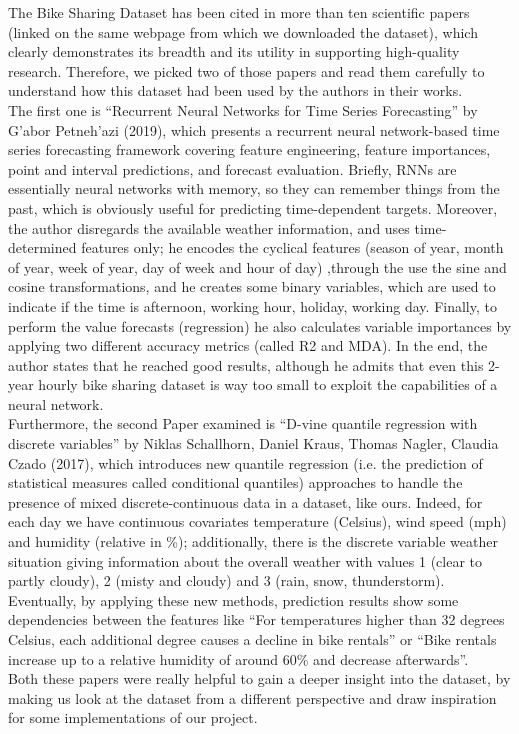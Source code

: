 \documentclass[11pt,a4paper]{article}
\begin{document}
The Bike Sharing Dataset has been cited in more than ten scientific papers (linked on the same webpage from which we downloaded the dataset), which clearly demonstrates its breadth and its utility in supporting high-quality research. Therefore, we picked two of those papers and read them carefully to understand how this dataset had been used by the authors in their works. \\
The first one is “Recurrent Neural Networks for Time Series Forecasting” by G'abor Petneh'azi (2019), which presents a recurrent neural network-based time series forecasting framework covering feature engineering, feature importances, point and interval predictions, and forecast evaluation. Briefly, RNNs are essentially neural networks with memory, so they can remember things from the past, which is obviously useful for predicting time-dependent targets. Moreover, the author disregards the available weather information, and uses time-determined features only; he encodes the cyclical features (season of year, month of year, week of year, day of week and hour of day) ,through the use the sine and cosine transformations, and he creates some binary variables, which are used to indicate if the time is afternoon, working hour, holiday, working day. Finally, to perform the value forecasts (regression) he also calculates variable importances by applying two different accuracy metrics (called R2 and MDA). In the end, the author states that he reached good results, although he admits that even this 2-year hourly bike sharing dataset is way too small to exploit the capabilities of a neural network. \\
Furthermore, the second Paper examined is “D-vine quantile regression with discrete variables” by Niklas Schallhorn, Daniel Kraus, Thomas Nagler, Claudia Czado (2017), which introduces new quantile regression (i.e. the prediction of statistical measures called conditional quantiles) approaches to handle the presence of mixed discrete-continuous data in a dataset, like ours. Indeed, for each day we have continuous covariates temperature (Celsius), wind speed (mph) and humidity (relative in \%); additionally, there is the discrete variable weather situation giving information about the overall weather with values 1 (clear to partly cloudy), 2 (misty and cloudy) and 3 (rain, snow, thunderstorm). Eventually, by applying these new methods, prediction results show some dependencies between the features like “For temperatures higher than 32 degrees Celsius, each additional degree causes a decline in bike rentals” or “Bike rentals increase up to a relative humidity of around 60\% and decrease afterwards”. \\ 
Both these papers were really helpful to gain a deeper insight into the dataset, by making us look at the dataset from a different perspective and draw inspiration for some implementations of our project.
\end{document}
